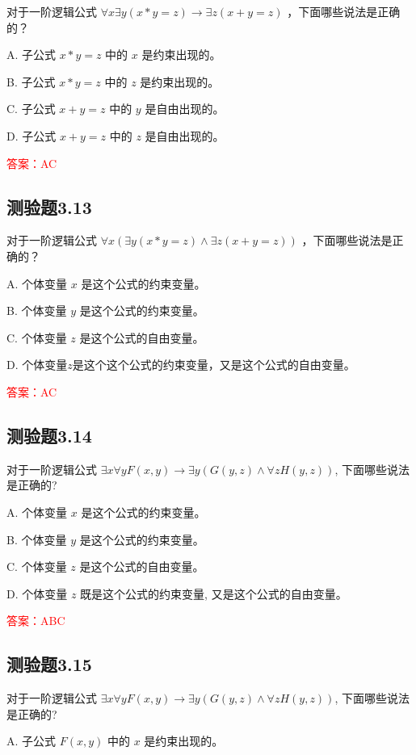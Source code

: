 \documentclass[UTF8, heading=true]{ctexart}
\begin{document}
对于一阶逻辑公式 $\forall x \exists y(x * y=z) \rightarrow \exists z(x+y=z)$ ，下面哪些说法是正确的？

A. 子公式 $x * y=z$ 中的 $x$ 是约束出现的。

B. 子公式 $x * y=z$ 中的 $z$ 是约束出现的。

C. 子公式 $x+y=z$ 中的 $y$ 是自由出现的。

D. 子公式 $x+y=z$ 中的 $z$ 是自由出现的。

\textcolor{red}{答案：AC}

\subsection{测验题3.13}

对于一阶逻辑公式 $\forall x(\exists y(x * y=z) \wedge \exists z(x+y=z))$ ，下面哪些说法是正确的？

A. 个体变量 $x$ 是这个公式的约束变量。

B. 个体变量 $y$ 是这个公式的约束变量。

C. 个体变量 $z$ 是这个公式的自由变量。

D. 个体变量$z$是这个这个公式的约束变量，又是这个公式的自由变量。

\textcolor{red}{答案：AC}

\subsection{测验题3.14}

对于一阶逻辑公式 $\exists x \forall y F(x, y) \rightarrow \exists y(G(y, z) \wedge \forall z H(y, z))$, 下面哪些说法是正确的?

A. 个体变量 $x$ 是这个公式的约束变量。

B. 个体变量 $y$ 是这个公式的约束变量。

C. 个体变量 $z$ 是这个公式的自由变量。

D. 个体变量 $z$ 既是这个公式的约束变量, 又是这个公式的自由变量。

\textcolor{red}{答案：ABC}

\subsection{测验题3.15}

对于一阶逻辑公式 $\exists x \forall y F(x, y) \rightarrow \exists y(G(y, z) \wedge \forall z H(y, z))$, 下面哪些说法是正确的?

A. 子公式 $F(x, y)$ 中的 $x$ 是约束出现的。
\end{document}
